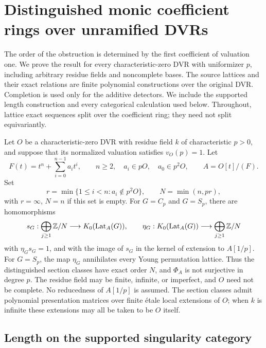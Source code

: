 \section{Distinguished monic coefficient rings over unramified DVRs}
\label{sec:unramified-distinguished-monic}\label{sec:singular-distinguished-monic}

The order of the obstruction is determined by the first coefficient
of valuation one.  We prove the result for every characteristic-zero
DVR with uniformizer \(p\), including arbitrary residue fields and
noncomplete bases.  The source lattices and their exact relations are
finite polynomial constructions over the original DVR.  Completion
is used only for the additive detectors.  We include the supported
length construction and every categorical calculation used below.
Throughout, lattice exact sequences split over the coefficient ring;
they need not split equivariantly.

\begin{theorem}\label{thm:unramified-distinguished-monic}\label{thm:singular-distinguished-monic}
Let \(O\) be a characteristic-zero DVR with residue field \(k\) of
characteristic \(p>0\), and suppose that its normalized valuation
satisfies \(v_O(p)=1\).  Let
\[
 F(t)=t^n+\sum_{i=0}^{n-1}a_it^i,
 \qquad n\ge2,\quad a_i\in pO,\quad a_0\in p^2O,
 \qquad A=O[t]/(F).
\]
Set
\[
 r=\min\{1\le i<n:a_i\notin p^2O\},\qquad N=\min(n,pr),
\]
with \(r=\infty\), \(N=n\) if this set is empty.
For \(G=C_p\) and \(G=S_p\), there are homomorphisms
\[
 s_G:\bigoplus_{j\ge1}\mathbb Z/N\longrightarrow K_0(\operatorname{Lat}_A(G)),
 \qquad
 \eta_G:K_0(\operatorname{Lat}_A(G))\longrightarrow\bigoplus_{j\ge1}\mathbb Z/N
\]
with \(\eta_Gs_G=1\), and with the image of \(s_G\) in the kernel
of extension to \(A[1/p]\).  For \(G=S_p\), the map \(\eta_G\)
annihilates every Young permutation lattice.  Thus the distinguished
section classes have exact order \(N\), and \(\Phi_A\) is not
surjective in degree \(p\).
The residue field may be finite, infinite, or imperfect, and \(O\)
need not be complete.  No reducedness of \(A[1/p]\) is assumed.
The section classes admit polynomial presentation matrices over finite
\'etale local extensions of \(O\); when \(k\) is infinite these
extensions may all be taken to be \(O\) itself.
\end{theorem}

\subsection{Length on the supported singularity category}

